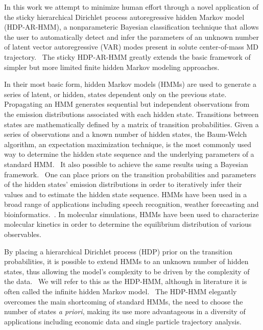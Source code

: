 \documentclass[journal=jpcbfk,manuscript=article]{achemso}
\begin{document}
  In this work we attempt to minimize human effort through a novel application of 
  the sticky hierarchical Dirichlet process autoregressive hidden Markov model 
  (HDP-AR-HMM), a nonparameteric Bayesian classification technique that allows the user to 
  automatically detect and infer the parameters of an unknown number of latent vector
  autoregressive (VAR) modes present in solute center-of-mass MD 
  trajectory.~\cite{fox_bayesian_2010} The sticky HDP-AR-HMM greatly extends the 
  basic framework of simpler but more limited finite hidden Markov modeling approaches.
    
  In their most basic form, hidden Markov models (HMMs) are used to generate
  a series of latent, or hidden, states dependent only on the previous state.~\cite{rabiner_tutorial_1989}
  Propagating an HMM generates sequential but independent observations from 
  the emission distributions associated with each hidden state. Transitions 
  between states are mathematically defined by a matrix of transition probabilities.
  Given a series of observations and a known number of hidden states, the 
  Baum-Welch algorithm, an expectation maximization technique, is the most commonly 
  used way to determine the hidden state sequence and the underlying parameters of
  a standard HMM.~\cite{baum_maximization_1970} It also possible to achieve the same
  results using a Bayesian framework.~\cite{scott_bayesian_2002,jasra_markov_2005} 
  One can place priors on the transition probabilities and parameters of the hidden 
  states' emission distributions in order to iteratively infer their values and to
  estimate the hidden state sequence. HMMs have been used in a broad range of applications
  including speech recognition, weather forecasting and bioinformatics.~\cite{juang_hidden_1984,hughes_non-homogeneous_1999,yoon_hidden_2009}.
  In molecular simulations, HMMs have been used to characterize molecular kinetics
  in order to determine the equilibrium distribution of various observables.~\cite{thayer_hidden_2002,singhal_using_2004,noe_probability_2008,noe_projected_2013}
  
  By placing a hierarchical Dirichlet process (HDP) prior on the transition 
  probabilities, it is possible to extend HMMs to an unknown number of hidden
  states, thus allowing the model's complexity to be driven by the complexity
  of the data.~\cite{teh_hierarchical_2006} We will refer to this as the HDP-HMM,
  although in literature it is often called the infinite hidden Markov 
  model.~\cite{beal_infinite_2002} The HDP-HMM elegantly overcomes the main
  shortcoming of standard HMMs, the need to choose the number of states 
  \textit{a priori}, making its use more advantageous in a diversity of 
  applications including economic data and single particle trajectory 
  analysis.~\cite{shi_identifying_2016,hines_analyzing_2015} 
\end{document}
